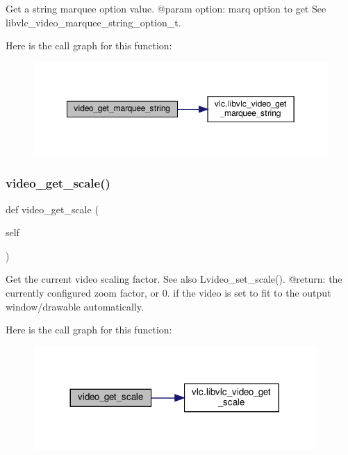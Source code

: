 \begin{DoxyVerb}Get a string marquee option value.
@param option: marq option to get See libvlc_video_marquee_string_option_t.
\end{DoxyVerb}
 Here is the call graph for this function\+:
\nopagebreak
\begin{figure}[H]
\begin{center}
\leavevmode
\includegraphics[width=349pt]{classvlc_1_1_media_player_adbbb7771337a1484af090fa488d0a360_cgraph}
\end{center}
\end{figure}
\mbox{\label{classvlc_1_1_media_player_a2f4f20abf38526de2f6e076c28c7cf3f}} 
\subsubsection{\texorpdfstring{video\+\_\+get\+\_\+scale()}{video\_get\_scale()}}
{\footnotesize\ttfamily def video\+\_\+get\+\_\+scale (\begin{DoxyParamCaption}\item[{}]{self }\end{DoxyParamCaption})}

\begin{DoxyVerb}Get the current video scaling factor.
See also L{video_set_scale}().
@return: the currently configured zoom factor, or 0. if the video is set to fit to the output window/drawable automatically.
\end{DoxyVerb}
 Here is the call graph for this function\+:
\nopagebreak
\begin{figure}[H]
\begin{center}
\leavevmode
\includegraphics[width=305pt]{classvlc_1_1_media_player_a2f4f20abf38526de2f6e076c28c7cf3f_cgraph}
\end{center}
\end{figure}
\mbox{\label{classvlc_1_1_media_player_a510a2f0ec76549207198544715c65783}} 
